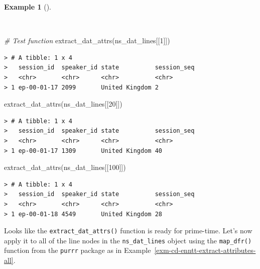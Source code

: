 \documentclass[
  letterpaper,
  DIV=11,
  numbers=noendperiod]{scrreport}
\newenvironment{Shaded}{\begin{snugshade}}{\end{snugshade}}
\newcommand{\CommentTok}[1]{\textcolor[rgb]{0.00,0.00,0.00}{\textit{#1}}}
\newcommand{\DecValTok}[1]{\textcolor[rgb]{0.00,0.00,0.00}{#1}}
\newcommand{\FunctionTok}[1]{\textcolor[rgb]{0.00,0.00,0.00}{#1}}
\newcommand{\NormalTok}[1]{\textcolor[rgb]{0.00,0.00,0.00}{#1}}
\theoremstyle{definition}
\newtheorem{example}{Example}[chapter]
\theoremstyle{remark}
\begin{document}
\begin{example}[]\protect\hypertarget{exm-cd-enntt-test-extract-attributes-function}{}\label{exm-cd-enntt-test-extract-attributes-function}

~

\begin{Shaded}
\begin{Highlighting}[]
\CommentTok{\# Test function}
\FunctionTok{extract\_dat\_attrs}\NormalTok{(ns\_dat\_lines[[}\DecValTok{1}\NormalTok{]])}
\end{Highlighting}
\end{Shaded}

\begin{verbatim}
> # A tibble: 1 x 4
>   session_id  speaker_id state          session_seq
>   <chr>       <chr>      <chr>          <chr>      
> 1 ep-00-01-17 2099       United Kingdom 2
\end{verbatim}

\begin{Shaded}
\begin{Highlighting}[]
\FunctionTok{extract\_dat\_attrs}\NormalTok{(ns\_dat\_lines[[}\DecValTok{20}\NormalTok{]])}
\end{Highlighting}
\end{Shaded}

\begin{verbatim}
> # A tibble: 1 x 4
>   session_id  speaker_id state          session_seq
>   <chr>       <chr>      <chr>          <chr>      
> 1 ep-00-01-17 1309       United Kingdom 40
\end{verbatim}

\begin{Shaded}
\begin{Highlighting}[]
\FunctionTok{extract\_dat\_attrs}\NormalTok{(ns\_dat\_lines[[}\DecValTok{100}\NormalTok{]])}
\end{Highlighting}
\end{Shaded}

\begin{verbatim}
> # A tibble: 1 x 4
>   session_id  speaker_id state          session_seq
>   <chr>       <chr>      <chr>          <chr>      
> 1 ep-00-01-18 4549       United Kingdom 28
\end{verbatim}

\end{example}

Looks like the \texttt{extract\_dat\_attrs()} function is ready for
prime-time. Let's now apply it to all of the line nodes in the
\texttt{ns\_dat\_lines} object using the \texttt{map\_dfr()} function
from the \texttt{purrr} package as in
Example~\ref{exm-cd-enntt-extract-attributes-all}.
\end{document}
